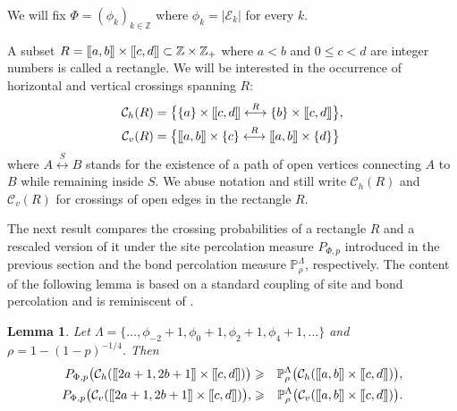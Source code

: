 \documentclass[a4paper,oneside,12pt]{amsart}
\def\llbracket{[\hspace{-.10em} [ }
\def\rrbracket{ ] \hspace{-.10em}]}
\renewcommand{\leq}{\leqslant}
\renewcommand{\geq}{\geqslant}
\theoremstyle{plain}
\newtheorem{lemma}{Lemma}
\theoremstyle{definition}
\theoremstyle{remark}
\newcommand{\Z}{{\mathbb{Z}}}
\renewcommand{\P}{\mathbb{P}}
\begin{document}
We will fix $\Phi = (\phi_k)_{k\in\mathbb{Z}}$ where $\phi_k = |\mathcal{E}_k|$ for every $k$.

A subset $R = \llbracket a,b \rrbracket \times \llbracket c,d \rrbracket \subset \Z \times \Z_+$ where $ a < b $ and $0 \leq c < d $ are integer numbers is called a rectangle.
We will be interested in the occurrence of horizontal and vertical crossings spanning $R$:
\begin{align*}
\mathcal{C}_{h}(R) &= \big\{ \{a\} \times \llbracket c,d \rrbracket \overset{R}\longleftrightarrow  \{b\} \times \llbracket c,d \rrbracket \big\}, \\ 
\mathcal{C}_{v}(R) &= \big\{  \llbracket a,b \rrbracket \times \{c\} \overset{R}\longleftrightarrow   \llbracket a,b \rrbracket \times \{d\} \big\}
\end{align*}
where $A \overset{S}\longleftrightarrow B$ stands for the existence of a path of open vertices connecting $A$ to $B$ while remaining inside $S$.
We abuse notation and still write $\mathcal{C}_{h}(R)$ and $\mathcal{C}_{v}(R)$ for crossings of open edges in the rectangle $R$.

The next result compares the crossing probabilities of a rectangle $R$ and a rescaled version of it under the site percolation measure $P_{\Phi,p}$ introduced in the previous section and the bond percolation measure $\mathbb{P}^{\Lambda}_\rho$, respectively. 
The content of the following lemma is based on a standard coupling of site and bond percolation and is reminiscent of \cite[Theorem 1.33]{Grimm}.

\begin{lemma}
\label{l:compare_site_bond}
Let $\Lambda = \{\ldots, \phi_{-2}+1, \phi_0+1, \phi_2+1, \phi_4+1, \ldots \}$ and $\rho = 1 - (1-p)^{-1/4}$.
Then
\begin{eqnarray}
P_{\Phi,p}\big(\mathcal{C}_{h}( \llbracket 2a+1,2b+1 \rrbracket \times\llbracket c,d \rrbracket )\big)  
& \geq & \P_{\rho}^{\Lambda}\big(\mathcal{C}_{h}(\llbracket a,b \rrbracket \times\llbracket c,d \rrbracket)\big), \\
P_{\Phi,p}\big(\mathcal{C}_{v}( \llbracket 2a+1,2b+1 \rrbracket \times\llbracket c,d \rrbracket )\big), 
& \geq & \P_{\rho}^{\Lambda}\big(\mathcal{C}_{v}(\llbracket a,b \rrbracket \times\llbracket c,d \rrbracket)\big).
\end{eqnarray}


\end{lemma}
\end{document}
